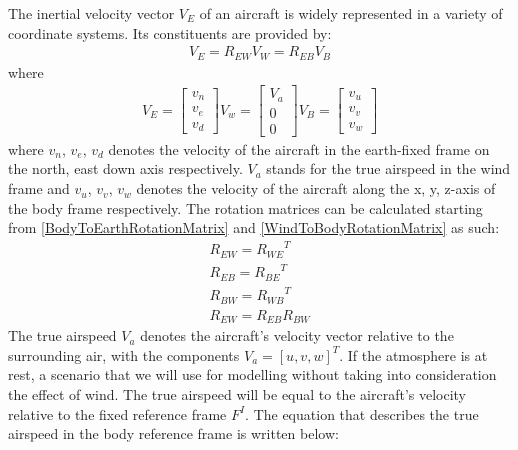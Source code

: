 \documentclass[conference]{IEEEtran}
\begin{document}
\par
The inertial velocity vector $V_E$ of an aircraft is widely represented in a
variety of coordinate systems. Its constituents are provided by:
\begin{align}
    {V_E}={R_{EW}V_W}={R_{EB}V_B}
    \label{VelocityRotationEquation}
\end{align}
where
\begin{align}
    {{V_E}=\begin{bmatrix}
                   v_n \\
                   v_e \\
                   v_d
               \end{bmatrix}}
    {{V_w}=\begin{bmatrix}
                   V_a \\
                   0   \\
                   0
               \end{bmatrix}}
    {{V_B}=\begin{bmatrix}
                   v_u \\
                   v_v \\
                   v_w
               \end{bmatrix}}
    \label{TrueAirspeed}
\end{align}
where $v_n$, $v_e$, $v_d$ denotes the velocity of the aircraft in the earth-fixed frame on the north, east down axis respectively. $V_a$ stands for the true airspeed in the wind frame and $v_u$, $v_v$, $v_w$
denotes the velocity of the aircraft along the x, y, z-axis of the body frame respectively. The rotation matrices can be calculated starting from {\ref{BodyToEarthRotationMatrix}} and {\ref{WindToBodyRotationMatrix}} as such:
\begin{align}
    {R_{EW}}={R_{WE}}^T \\
    {R_{EB}}={R_{BE}}^T \\
    {R_{BW}}={R_{WB}}^T \\
    {R_{EW}}={R_{EB}R_{BW}}
    \label{MatrixRotationEquation}
\end{align}
The true airspeed $V_a$ denotes the aircraft's velocity vector relative to the surrounding air, with the components $V_a={[u,v,w]}^T$.
If the atmosphere is at rest, a scenario that we will use for modelling without taking into consideration the effect of wind. The true airspeed will be equal to the aircraft's velocity relative to the fixed reference frame $F^I$.
The equation that describes the true airspeed in the body reference frame is written below:
\end{document}
